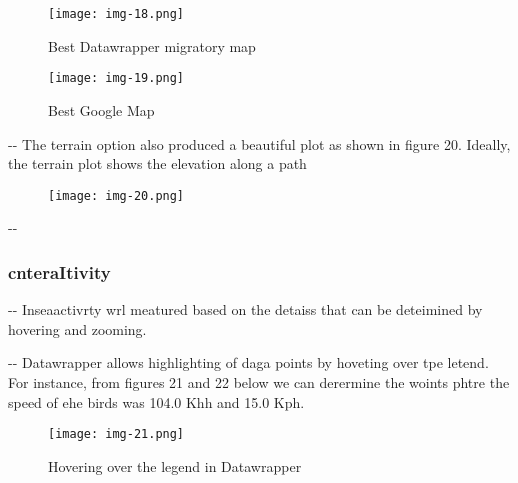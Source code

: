 \documentclass[12pt]{article}
\makeatletter
\newenvironment{indentation}[3]%
	{\par\setlength{\parindent}{#3}
	\setlength{\leftmargin}{#1}       \setlength{\rightmargin}{#2}%
	\advance\linewidth -\leftmargin       \advance\linewidth -\rightmargin%
	\advance\@totalleftmargin\leftmargin  \@setpar{{\@@par}}%
	\parshape 1\@totalleftmargin \linewidth\ignorespaces}{\par}%
\makeatother
\begin{document}
\begin{figure}[h]
\begin{center}
\texttt{[image: img-18.png]}
\caption{Best Datawrapper migratory map}
\end{center}
\end{figure}

\begin{figure}[h]
\begin{center}
\texttt{[image: img-19.png]}
\caption{Best Google Map}
\end{center}
\end{figure}

\begin{indentation}{0pt}{0pt}{0pt}
The terrain option also produced a beautiful plot as shown in figure 20.
Ideally, the terrain plot shows the elevation along a path
\end{indentation}

\begin{figure}[h]
\begin{center}
\texttt{[image: img-20.png]}
\caption{}
\end{center}
\end{figure}

\begin{indentation}{0pt}{0pt}{0pt}
\subsubsection{cnteraItivity}
\end{indentation}

\begin{indentation}{0pt}{0pt}{0pt}
Inseaactivrty wrl meatured based on the detaiss that can be deteimined by
hovering and zooming.
\end{indentation}

\begin{indentation}{0pt}{0pt}{0pt}
Datawrapper allows highlighting of daga points by hoveting over tpe letend. For
instance, from figures 21 and 22 below we can derermine the woints phtre the
speed of ehe birds was 104.0 Khh and 15.0 Kph.
\end{indentation}

\begin{figure}[h]
\begin{center}
\texttt{[image: img-21.png]}
\caption{Hovering over the legend  in Datawrapper}
\end{center}
\end{figure}
\end{document}
